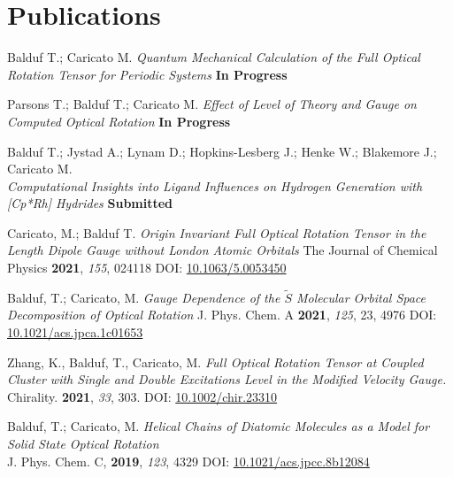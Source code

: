 \documentclass[a4paper,20pt]{article}
\begin{document}
\section{Publications}
  \begin{etaremune}
  
  \item Balduf T.; Caricato M. \textit{Quantum Mechanical Calculation of the Full Optical Rotation Tensor for Periodic Systems} \textbf{In Progress}
  
  \item Parsons T.; Balduf T.; Caricato M. \textit{Effect of Level of Theory and Gauge on Computed Optical Rotation} \textbf{In Progress}
  
  \item Balduf T.; Jystad A.; Lynam D.; Hopkins-Lesberg J.;  Henke W.; Blakemore J.; Caricato M. \\ \textit{Computational Insights into Ligand Influences on Hydrogen Generation with [Cp*Rh] Hydrides} \textbf{Submitted}
  
  \item Caricato, M.; Balduf T. \textit{Origin Invariant Full Optical Rotation Tensor in the Length Dipole Gauge without London Atomic Orbitals} The Journal of Chemical Physics \textbf{2021}, \textit{155}, 024118 DOI: \href{https://doi.org/10.1063/5.0053450}{10.1063/5.0053450} 
  
  \item Balduf, T.; Caricato, M. \textit{Gauge Dependence of the $\tilde{S}$ Molecular Orbital Space Decomposition of Optical Rotation} J. Phys. Chem. A \textbf{2021}, \textit{125}, 23, 4976 DOI: \href{https://doi.org/10.1021/acs.jpca.1c01653}{10.1021/acs.jpca.1c01653} 
  
  \item Zhang, K., Balduf, T., Caricato, M. \textit{Full Optical Rotation Tensor at Coupled Cluster with Single and Double Excitations Level in the Modified Velocity Gauge.} Chirality. \textbf{2021}, \textit{33}, 303. DOI:   \href{https://doi.org/10.1002/chir.23310}{10.1002/chir.23310}
  
  \item Balduf, T.; Caricato, M. \textit{Helical Chains of Diatomic Molecules as a Model for Solid State Optical Rotation} \\J. Phys. Chem. C, \textbf{2019}, \textit{123}, 4329 DOI: \href{https://doi.org/10.1021/acs.jpcc.8b12084}{10.1021/acs.jpcc.8b12084} 
  \end{etaremune}
\vspace{-5pt}
	    
\end{document}
